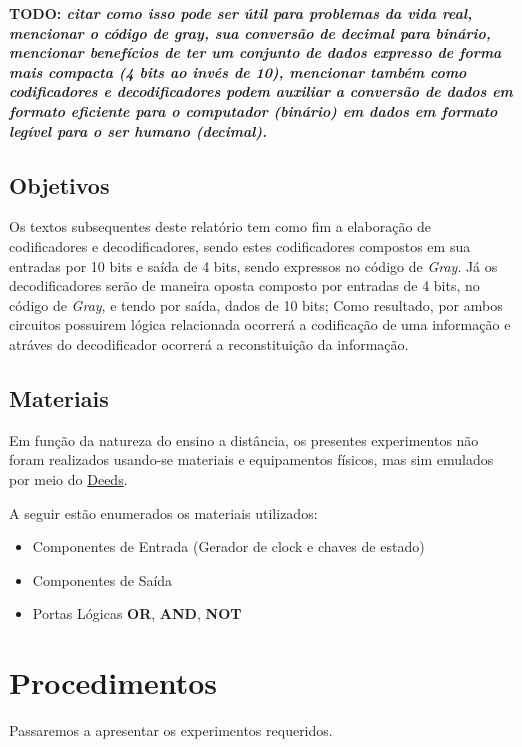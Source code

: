 \documentclass[12pt]{article}
\begin{document}
\textbf{TODO: \emph{citar como isso pode ser útil para problemas da vida real,
    mencionar o código de gray, sua conversão de decimal para binário, mencionar
    benefícios de ter um conjunto de dados expresso de forma mais compacta (4
    bits ao invés de 10), mencionar também como codificadores e decodificadores
    podem auxiliar a conversão de dados em formato eficiente para o computador
    (binário) em dados em formato legível para o ser humano (decimal). }}

\subsection{Objetivos}
\label{sec:Objetivos}

Os textos subsequentes deste relatório tem como fim a elaboração de
codificadores e decodificadores, sendo estes codificadores compostos em sua
entradas por 10 bits e saída de 4 bits, sendo expressos no código de
\emph{Gray}. Já os decodificadores serão de maneira oposta composto por entradas
de 4 bits, no código de \emph{Gray}, e tendo por saída, dados de 10 bits; Como
resultado, por ambos circuitos possuirem lógica relacionada ocorrerá a
codificação de uma informação e atráves do decodificador ocorrerá a
reconstituição da informação.

\subsection{Materiais}
\label{sec:Materiais}
Em função da natureza do ensino a distância, os presentes experimentos não foram
realizados usando-se materiais e equipamentos físicos, mas sim emulados por meio
do \href{https://www.digitalelectronicsdeeds.com/deeds.html}{Deeds}.

A seguir estão enumerados os materiais utilizados:
\begin{itemize}
    \item Componentes de Entrada (Gerador de clock e chaves de estado)
    \item Componentes de Saída
    \item Portas Lógicas \textbf{OR}, \textbf{AND}, \textbf{NOT}
\end{itemize}

\section{Procedimentos}
\label{sec:Procedimentos}

Passaremos a apresentar os experimentos requeridos.
\end{document}
